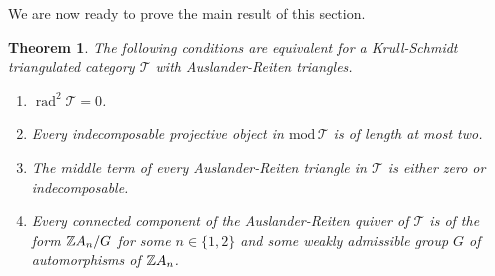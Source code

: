 \documentclass[12pt]{amsart}
\numberwithin{equation}{subsection}
\theoremstyle{plain}
\newtheorem{theorem}{Theorem}[section]
\theoremstyle{definition}
\newcommand{\rad}{\operatorname{rad}}
\renewcommand{\mod}{\mathrm{mod}\,}
\newcommand{\Z}{\operatorname{\mathbb{Z}}\nolimits}
\newcommand{\T}{\mathcal{T}}
\newcommand{\ZA}{\Z\hspace{-.6mm}A}
\begin{document}
We are now ready to prove the main result of this section.






\begin{theorem}
\label{claim_3}
The following conditions are equivalent for a Krull-Schmidt triangulated category $\T$ with Auslander-Reiten triangles.
\begin{enumerate}
\item $\rad^2\T = 0$.
\item Every indecomposable projective object in $\mod\T$ is of length at most two.
\item The middle term of every Auslander-Reiten triangle in $\T$ is either zero or indecomposable.
\item Every connected component of the Auslander-Reiten quiver of $\T$ is of the form $\ZA_n/G$ for some $n \in\{1, 2\}$ and some weakly admissible group $G$ of automorphisms of $\ZA_n$.  
\end{enumerate}
\end{theorem}
\end{document}
